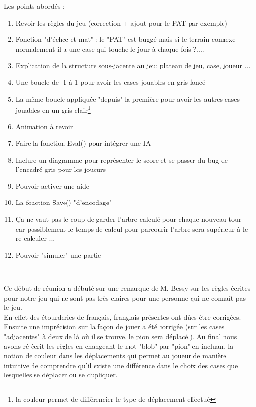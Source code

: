 \documentclass[11pt,a4paper]{article}
\begin{document}
Les points abordés :
\begin{enumerate}
    \item Revoir les règles du jeu (correction + ajout pour le PAT par exemple)
    \item Fonction "d'échec et mat" : le "PAT" est buggé mais si le terrain connexe normalement il a une case qui touche le jour à chaque fois ?....
    \item Explication de la structure sous-jacente au jeu: plateau de jeu, case, joueur ...
    \item Une boucle de -1 à 1 pour avoir les cases jouables en gris foncé
    \item La même boucle appliquée "depuis" la première pour avoir les autres cases jouables en un gris clair\footnote{la couleur permet de différencier le type de déplacement effectué}
    \item Animation à revoir
    \item Faire la fonction Eval() pour intégrer une IA
    \item Inclure un diagramme pour représenter le score et se passer du bug de l'encadré gris pour les joueurs
    \item Pouvoir activer une aide 
    \item La fonction Save() "d'encodage"
    \item Ça ne vaut pas le coup de garder l'arbre calculé pour chaque nouveau tour car possiblement le temps de calcul pour parcourir l'arbre sera supérieur à le re-calculer ...
    \item Pouvoir "simuler" une partie
    
\end{enumerate}
\begin{tabular}{c}
    \hline
\end{tabular}
\\
Ce début de réunion a débuté sur une remarque de M. Bessy sur les règles écrites pour notre jeu qui ne sont pas très claires pour une personne qui ne connaît pas le jeu.\\
En effet des étourderies de français, franglais présentes ont dûes être corrigées. Ensuite une imprécision sur la façon de jouer a été corrigée (sur les cases "adjacentes" à deux de là où il se trouve, le pion sera déplacé.). Au final nous avons ré-écrit les règles en changeant le mot "blob" par "pion" en incluant la notion de couleur dans les déplacements qui permet au joueur de manière intuitive de comprendre qu'il existe une différence dans le choix des cases que lesquelles se déplacer ou se dupliquer.\\
\end{document}
